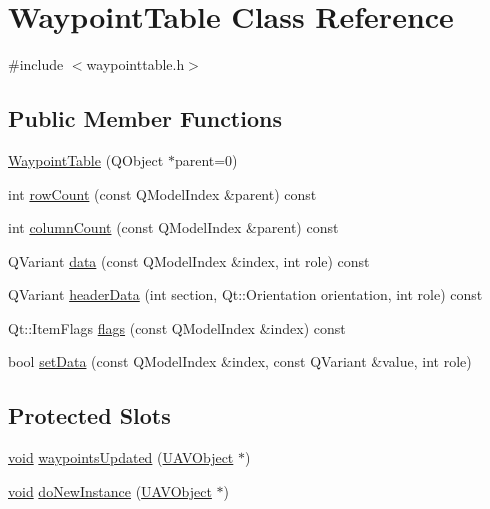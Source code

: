 \hypertarget{class_waypoint_table}{\section{\-Waypoint\-Table \-Class \-Reference}
\label{class_waypoint_table}
}


{\ttfamily \#include $<$waypointtable.\-h$>$}

\subsection*{\-Public \-Member \-Functions}
\begin{DoxyCompactItemize}
\item 
\hyperlink{group___waypoint_editor_gadget_plugin_ga62b0d5f07aaa7e091ea9b812437936a3}{\-Waypoint\-Table} (\-Q\-Object $\ast$parent=0)
\item 
int \hyperlink{group___waypoint_editor_gadget_plugin_ga0e60d1faba432ebe1d1e8de7c8cf02bf}{row\-Count} (const \-Q\-Model\-Index \&parent) const 
\item 
int \hyperlink{group___waypoint_editor_gadget_plugin_gac82408f059700c3a127f3d9a2f870d27}{column\-Count} (const \-Q\-Model\-Index \&parent) const 
\item 
\-Q\-Variant \hyperlink{group___waypoint_editor_gadget_plugin_ga983933a1c8fe4e9e8489d7b0f2b78461}{data} (const \-Q\-Model\-Index \&index, int role) const 
\item 
\-Q\-Variant \hyperlink{group___waypoint_editor_gadget_plugin_ga73be101f51619703a8a69f23849f87b6}{header\-Data} (int section, \-Qt\-::\-Orientation orientation, int role) const 
\item 
\-Qt\-::\-Item\-Flags \hyperlink{group___waypoint_editor_gadget_plugin_ga268c5385ef4dc152ddcee5ff2fddbaba}{flags} (const \-Q\-Model\-Index \&index) const 
\item 
bool \hyperlink{group___waypoint_editor_gadget_plugin_gae65ee6e837693667105fc594acc874eb}{set\-Data} (const \-Q\-Model\-Index \&index, const \-Q\-Variant \&value, int role)
\end{DoxyCompactItemize}
\subsection*{\-Protected \-Slots}
\begin{DoxyCompactItemize}
\item 
\hyperlink{group___u_a_v_objects_plugin_ga444cf2ff3f0ecbe028adce838d373f5c}{void} \hyperlink{group___waypoint_editor_gadget_plugin_ga8bb82818bb89a4aa0b56bdda689058cd}{waypoints\-Updated} (\hyperlink{class_u_a_v_object}{\-U\-A\-V\-Object} $\ast$)
\item 
\hyperlink{group___u_a_v_objects_plugin_ga444cf2ff3f0ecbe028adce838d373f5c}{void} \hyperlink{group___waypoint_editor_gadget_plugin_gadfa77191d509fa658e36cdff9553dd25}{do\-New\-Instance} (\hyperlink{class_u_a_v_object}{\-U\-A\-V\-Object} $\ast$)
\end{DoxyCompactItemize}


